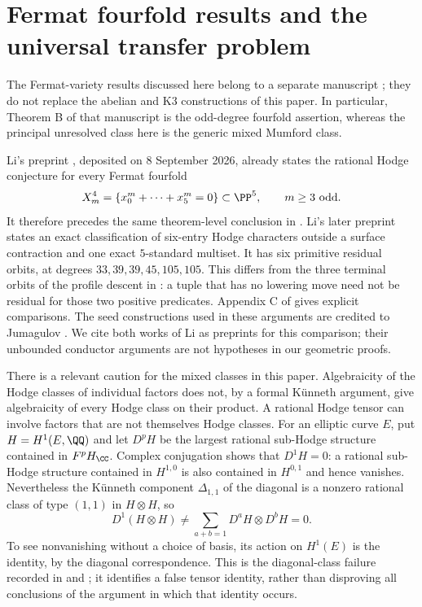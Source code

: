 \section{Fermat fourfold results and the universal transfer problem}
\label{app:fermat-related}

The Fermat-variety results discussed here belong to a separate
manuscript \cite{Bha26fermat}; they do not replace the abelian and K3
constructions of this paper. In particular, Theorem B of that
manuscript is the odd-degree fourfold assertion, whereas the principal
unresolved class here is the generic mixed Mumford class.

Li's preprint \cite[Theorem~1.1]{Li26odd}, deposited on 8 September
2026, already states the rational Hodge conjecture for every Fermat
fourfold
\[
 X_m^4=\{x_0^m+\cdots+x_5^m=0\}\subset\PP^5,
 \qquad m\ge3\ \text{odd}.
\]
It therefore precedes the same theorem-level conclusion in
\cite{Bha26fermat}. Li's later preprint
\cite[Theorem~A and Theorem~7.20]{Li26residual} states an exact
classification of six-entry Hodge characters outside a surface
contraction and one exact $5$-standard multiset. It has six primitive
residual orbits, at degrees $33,39,39,45,105,105$.
This differs from the three terminal orbits of the profile descent in
\cite{Bha26fermat}: a tuple that has no lowering move need not be
residual for those two positive predicates. Appendix C of
\cite{Bha26fermat} gives explicit comparisons. The seed constructions
used in these arguments are credited to Jumagulov
\cite[Theorems~1.2--1.4]{Jum26odd}.
We cite both works of Li as preprints for this comparison; their
unbounded conductor arguments are not hypotheses in our geometric
proofs.

There is a relevant caution for the mixed classes in this paper.
Algebraicity of the Hodge classes of individual factors does not, by a
formal K\"unneth argument, give algebraicity of every Hodge class on
their product. A rational Hodge tensor can involve factors that are
not themselves Hodge classes. For an elliptic curve $E$, put
$H=H^1(E,\QQ)$ and let $D^pH$ be the largest rational sub-Hodge
structure contained in $F^pH_{\CC}$. Complex conjugation shows that
$D^1H=0$: a rational sub-Hodge structure contained in $H^{1,0}$ is
also contained in $H^{0,1}$ and hence vanishes. Nevertheless the
K\"unneth component $\Delta_{1,1}$ of the diagonal is a nonzero
rational class of type $(1,1)$ in $H\otimes H$, so
\[
 D^1(H\otimes H)\ne
 \sum_{a+b=1}D^aH\otimes D^bH=0.
\]
To see nonvanishing without a choice of basis, its action on $H^1(E)$
is the identity, by the diagonal correspondence. This is the
diagonal-class failure recorded in \cite[\S1.1]{Li26odd} and
\cite[Remark~3.21]{Bha26fermat}; it identifies a false tensor identity,
rather than disproving all conclusions of the argument in which that
identity occurs.

